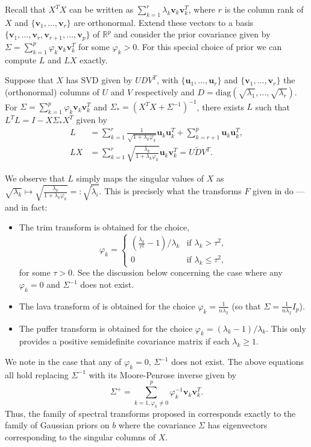 \documentclass[11pt]{article}
\newcommand{\R}{\mathbb{R}}
\newcommand{\postCov}{\Sigma_*}
\begin{document}
Recall that $X^TX$ can be written as $\sum_{k = 1}^r \lambda_k \mathbf{v}_k \mathbf{v}_k^T$, where $r$ is the column rank of $X$ and $\{\mathbf{v}_1, \dots, \mathbf{v}_r\}$ are orthonormal. Extend these vectors to a basis $\{\mathbf{v}_1, \dots,\mathbf{v}_r, \mathbf{v}_{r+1},\dots,  \mathbf{v}_p\}$ of $\R^p$ and consider the prior covariance given by $\Sigma = \sum_{k = 1}^p \varphi_k \mathbf{v}_k \mathbf{v}_k^T$ for some $\varphi_k > 0$.
For this special choice of prior we can compute $L$ and $LX$ exactly. 
\begin{lemma}\label{lem:L_and_LX}
	Suppose that $X$ has SVD given by $UDV^T$, with $\{\mathbf{u}_1, \dots, \mathbf{u}_r\}$ and $\{\mathbf{v}_1, \dots, \mathbf{v}_r\}$ the (orthonormal) columns of $U$ and $V$ respectively and $D = \textrm{diag}(\sqrt{\lambda_1}, \dots, \sqrt{\lambda_r})$. For $\Sigma = \sum_{k = 1}^p \varphi_k \mathbf{v}_k\mathbf{v}_k^T$ and $\postCov  = (X^TX + \Sigma^{-1})^{-1}$, there exists $L$ such that $L^TL = I - X\postCov X^T$ given by
	\begin{align*}
L &= \sum_{k = 1}^r \frac{1}{\sqrt{1+\lambda_k \varphi_k}} \mathbf{u}_k \mathbf{u}_k^T + \sum_{k = r + 1}^p \mathbf{u}_k \mathbf{u}_k^T	,	\\
LX &= \sum_{k = 1}^r \sqrt{\frac{\lambda_k}{1+\lambda_k\varphi_k}} \mathbf{u}_k \mathbf{v}_k^T = U\tilde{D}V^T.		
	\end{align*}
	
\end{lemma}
We observe that $L$ simply maps the singular values of $X$ as
	$
	\sqrt{\lambda_k} \mapsto \sqrt{\frac{\lambda_k}{1+\lambda_k \varphi_k}} =: \sqrt{\tilde{\lambda}_i}.
	$
This is precisely what the transforms $F$ given in \cite{CBM2020} do --- and
in fact:
\begin{itemize}
\item The trim transform is obtained for the choice,
$$
\varphi_k = \begin{cases}
 \left(\frac{\lambda_k}{\tau^2} - 1\right)/\lambda_k	 & \textrm{if } \lambda_k > \tau^2, \\
 0 & \textrm{if } \lambda_k \leq \tau^2,
 \end{cases}
$$
for some $\tau > 0$.
See the discussion below concerning the case where any $\varphi_k = 0$ and $\Sigma^{-1}$ does not exist.
\item The lava transform of \cite{Chernozhukov2017} is obtained for the choice $\varphi_k = \frac{1}{n\lambda_2}$ (so that $\Sigma = \frac{1}{n\lambda_2} I_p$).
\item The puffer transform is obtained for the choice $\varphi_k = (\lambda_k - 1)/\lambda_k$. This only provides a positive semidefinite covariance matrix if each $\lambda_k \geq 1$.
\end{itemize}
We note in the case that any of $\varphi_k = 0$, $\Sigma^{-1}$ does not exist. The above equations all hold replacing $\Sigma^{-1}$ with its Moore-Penrose inverse given by
 $$
 \Sigma^+ = \sum_{k = 1, \varphi_k \neq 0}^p \varphi_k^{-1} \mathbf{v}_k \mathbf{v}_k^T.
 $$
 Thus, the family of spectral transforms proposed in \cite{CBM2020} corresponds exactly to the family of Gaussian priors on $b$ where the covariance $\Sigma$ has eigenvectors corresponding to the singular columns of $X$.
\end{document}

